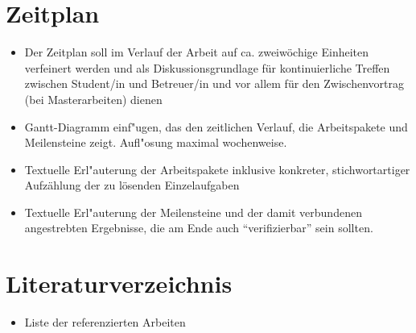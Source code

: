 \documentclass[a4paper, 11pt]{article}
\begin{document}
\section {Zeitplan}
\begin{itemize}
\item{Der Zeitplan soll im Verlauf der Arbeit auf ca. zweiw\"{o}chige Einheiten verfeinert werden und als
Diskussionsgrundlage f\"{u}r kontinuierliche Treffen zwischen Student/in und Betreuer/in und vor allem f\"{u}r den Zwischenvortrag (bei Masterarbeiten) dienen}
\item{Gantt-Diagramm einf"{u}gen, das den zeitlichen Verlauf, die Arbeitspakete und Meilensteine zeigt. Aufl"{o}sung maximal wochenweise.}
\item{Textuelle Erl"{a}uterung der Arbeitspakete inklusive konkreter, stichwortartiger Aufz\"{a}hlung der zu l\"{o}senden Einzelaufgaben }
\item{Textuelle Erl"{a}uterung der Meilensteine und der damit verbundenen angestrebten Ergebnisse, die am Ende auch "`verifizierbar"' sein sollten.}
\end{itemize}


\section {Literaturverzeichnis}
\begin{itemize}
\item{Liste der referenzierten Arbeiten}
\end{itemize}

%
%
\end{document}
